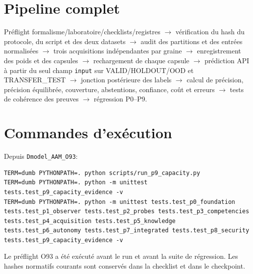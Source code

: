 \documentclass[11pt,a4paper,oneside]{report}
\begin{document}
\section{Pipeline complet}
Préflight formalisme/laboratoire/checklists/registres $\rightarrow$ vérification du hash du protocole, du script et des deux datasets $\rightarrow$ audit des partitions et des entrées normalisées $\rightarrow$ trois acquisitions indépendantes par graine $\rightarrow$ enregistrement des poids et des capsules $\rightarrow$ rechargement de chaque capsule $\rightarrow$ prédiction API à partir du seul champ \texttt{input} sur VALID/HOLDOUT/OOD et TRANSFER\_TEST $\rightarrow$ jonction postérieure des labels $\rightarrow$ calcul de précision, précision équilibrée, couverture, abstentions, confiance, coût et erreurs $\rightarrow$ tests de cohérence des preuves $\rightarrow$ régression P0--P9.

\section{Commandes d'exécution}
Depuis \texttt{Dmodel\_AAM\_O93}:
\begin{lstlisting}[basicstyle=\ttfamily\small,breaklines=true]
TERM=dumb PYTHONPATH=. python scripts/run_p9_capacity.py
TERM=dumb PYTHONPATH=. python -m unittest tests.test_p9_capacity_evidence -v
TERM=dumb PYTHONPATH=. python -m unittest tests.test_p0_foundation tests.test_p1_observer tests.test_p2_probes tests.test_p3_competencies tests.test_p4_acquisition tests.test_p5_knowledge tests.test_p6_autonomy tests.test_p7_integrated tests.test_p8_security tests.test_p9_capacity_evidence -v
\end{lstlisting}
Le préflight O93 a été exécuté avant le run et avant la suite de régression. Les hashes normatifs courants sont conservés dans la checklist et dans le checkpoint.
\end{document}
